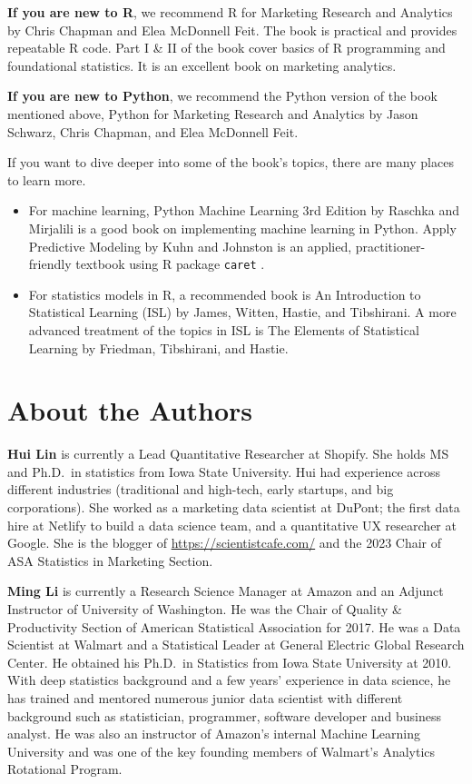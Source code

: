 \documentclass[
  12pt,
]{krantz}
\begin{document}
\textbf{If you are new to R}, we recommend R for Marketing Research and Analytics by Chris Chapman and Elea McDonnell Feit. The book is practical and provides repeatable R code. Part I \& II of the book cover basics of R programming and foundational statistics. It is an excellent book on marketing analytics.

\textbf{If you are new to Python}, we recommend the Python version of the book mentioned above, Python for Marketing Research and Analytics by Jason Schwarz, Chris Chapman, and Elea McDonnell Feit.

If you want to dive deeper into some of the book's topics, there are many places to learn more.

\begin{itemize}
\item
  For machine learning, Python Machine Learning 3rd Edition by Raschka and Mirjalili is a good book on implementing machine learning in Python. Apply Predictive Modeling by Kuhn and Johnston is an applied, practitioner-friendly textbook using R package \texttt{caret} .
\item
  For statistics models in R, a recommended book is An Introduction to Statistical Learning (ISL) by James, Witten, Hastie, and Tibshirani. A more advanced treatment of the topics in ISL is The Elements of Statistical Learning by Friedman, Tibshirani, and Hastie.
\end{itemize}

\hypertarget{about-the-authors}{%
\chapter*{About the Authors}\label{about-the-authors}}


\textbf{Hui Lin} is currently a Lead Quantitative Researcher at Shopify. She holds MS and Ph.D.~in statistics from Iowa State University. Hui had experience across different industries (traditional and high-tech, early startups, and big corporations). She worked as a marketing data scientist at DuPont; the first data hire at Netlify to build a data science team, and a quantitative UX researcher at Google. She is the blogger of \url{https://scientistcafe.com/} and the 2023 Chair of ASA Statistics in Marketing Section.

\textbf{Ming Li} is currently a Research Science Manager at Amazon and an Adjunct Instructor of University of Washington. He was the Chair of Quality \& Productivity Section of American Statistical Association for 2017. He was a Data Scientist at Walmart and a Statistical Leader at General Electric Global Research Center. He obtained his Ph.D.~in Statistics from Iowa State University at 2010. With deep statistics background and a few years' experience in data science, he has trained and mentored numerous junior data scientist with different background such as statistician, programmer, software developer and business analyst. He was also an instructor of Amazon's internal Machine Learning University and was one of the key founding members of Walmart's Analytics Rotational Program.
\end{document}
